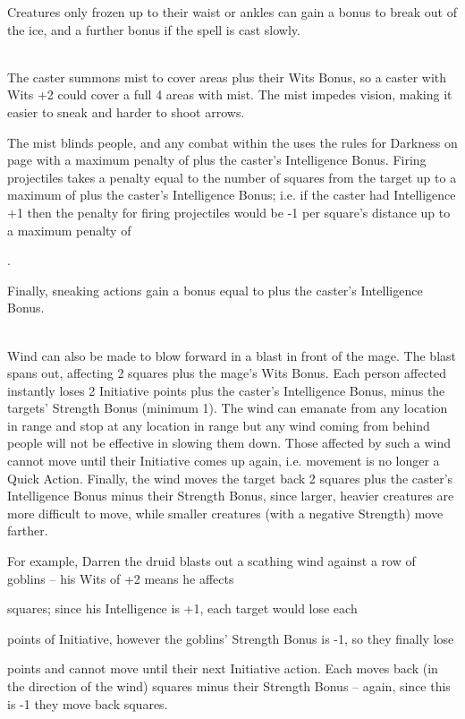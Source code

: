 \documentclass[titlepage,a4paper,openany]{book}
\begin{document}
\begin{multicols}{2}
Creatures only frozen up to their waist or ankles can gain a bonus to break out of the ice, and a further bonus if the spell is cast slowly.

\\
The caster summons mist to cover  areas plus their Wits Bonus, so a caster with Wits +2 could cover a full 4 areas with mist. The mist impedes vision, making it easier to sneak and harder to shoot arrows.

The mist blinds people, and any combat within the uses the rules for Darkness on page \pageref{darkness} with a maximum penalty of  plus the caster's Intelligence Bonus. Firing projectiles takes a penalty equal to the number of squares from the target up to a maximum of  plus the caster's Intelligence Bonus; i.e. if the caster had Intelligence +1 then the penalty for firing projectiles would be -1 per square's distance up to a maximum penalty of \setcounter{list}{0}\addtocounter{list}{-1}\addtocounter{list}{-\value{spelllevel}}.

Finally, sneaking actions gain a bonus equal to  plus the caster's Intelligence Bonus.

\\
Wind can also be made to blow forward in a blast in front of the mage. The blast spans out, affecting 2 squares plus the mage's Wits Bonus. Each person affected instantly loses 2 Initiative points plus the caster's Intelligence Bonus, minus the targets' Strength Bonus (minimum 1). The wind can emanate from any location in range and stop at any location in range but any wind coming from behind people will not be effective in slowing them down. Those affected by such a wind cannot move until their Initiative comes up again, i.e. movement is no longer a Quick Action. Finally, the wind moves the target back 2 squares plus the caster's Intelligence Bonus minus their Strength Bonus, since larger, heavier creatures are more difficult to move, while smaller creatures (with a negative Strength) move farther.

For example, Darren the druid blasts out a scathing wind against a row of goblins -- his Wits of +2 means he affects \setcounter{list}{2}\addtocounter{list}{\value{spelllevel}} squares; since his Intelligence is +1, each target would lose each \setcounter{enc}{1}\addtocounter{enc}{\value{spelllevel}} points of Initiative, however the goblins' Strength Bonus is -1, so they finally lose \addtocounter{enc}{1} points and cannot move until their next Initiative action.
Each moves back (in the direction of the wind)  squares minus their Strength Bonus -- again, since this is -1 they move back  squares.


\end{multicols}
\end{document}
